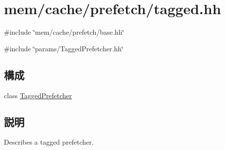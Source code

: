 \hypertarget{tagged_8hh}{
\section{mem/cache/prefetch/tagged.hh}
\label{tagged_8hh}
}
{\ttfamily \#include \char`\"{}mem/cache/prefetch/base.hh\char`\"{}}\par
{\ttfamily \#include \char`\"{}params/TaggedPrefetcher.hh\char`\"{}}\par
\subsection*{構成}
\begin{DoxyCompactItemize}
\item 
class \hyperlink{classTaggedPrefetcher}{TaggedPrefetcher}
\end{DoxyCompactItemize}


\subsection{説明}
Describes a tagged prefetcher. 